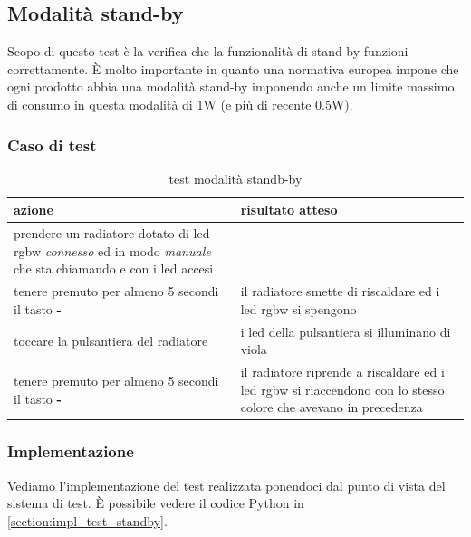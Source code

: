 \documentclass[12pt,a4paper,twoside,titlepage]{book}
\begin{document}
\subsection{Modalità stand-by}
\label{section:test_standby}

Scopo di questo test è la verifica che la funzionalità di stand-by funzioni correttamente.
È molto importante in quanto una normativa europea impone che ogni prodotto abbia una
modalità stand-by imponendo anche un limite massimo di consumo in questa modalità di 1W
(e più di recente 0.5W).

\subsubsection{Caso di test}

\begin{table}
    \centering
    \begin{tabular}{| p{} | p{} |}
        \hline 
        \textbf{azione} & \textbf{risultato atteso} \\ \hline
        prendere un radiatore dotato di \acrshort{led} \acrshort{rgbw} \textit{connesso} ed in modo \textit{manuale} che sta chiamando e con i \acrshort{led} accesi & \\ \hline
        tenere premuto per almeno 5 secondi il tasto \textbf{-} & il radiatore smette di riscaldare ed i \acrshort{led} \acrshort{rgbw} si spengono \\ \hline
        toccare la pulsantiera del radiatore & i \acrshort{led} della pulsantiera si illuminano di viola \\ \hline
        tenere premuto per almeno 5 secondi il tasto \textbf{-} & il radiatore riprende a riscaldare ed i \acrshort{led} \acrshort{rgbw} si riaccendono con lo stesso colore che avevano in precedenza \\ \hline
    \end{tabular}
    \caption{test modalità standb-by}
\end{table}

\subsubsection{Implementazione}
Vediamo l'implementazione del test realizzata ponendoci dal punto di vista del sistema di test. 
È possibile vedere il codice Python in \autoref{section:impl_test_standby}.
\end{document}

